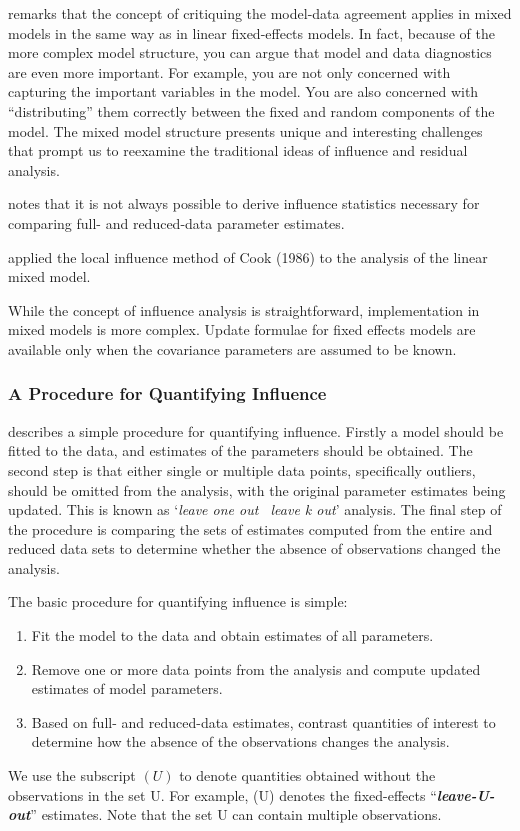 \documentclass[12pt, a4paper]{report}
\theoremstyle{plain}
\theoremstyle{definition}
\theoremstyle{remark}
\begin{document}
	\citet{schabenberger} remarks that the concept of critiquing the model-data agreement applies in mixed models in the same way as in linear
	fixed-effects models. In fact, because of the more complex model structure, you can argue that model and
	data diagnostics are even more important. For example, you are not only concerned with capturing the
	important variables in the model. You are also concerned with ``distributing” them correctly between the
	fixed and random components of the model. The mixed model structure presents unique and interesting
	challenges that prompt us to reexamine the traditional ideas of influence and residual analysis.
	
	
	
	\citet{schabenberger} notes that it is not always possible to derive influence statistics necessary for comparing full- and
	reduced-data parameter estimates. 
	
	\citet{Beckman} applied the local influence method of Cook (1986) to the analysis of the linear mixed model.
	
	While the concept of influence analysis is straightforward, implementation in mixed models is more complex. Update formulae for fixed effects models are available only when the covariance parameters are assumed to be known.
	
	
	
	
	\subsubsection{A Procedure for Quantifying Influence}  %
	\citet{schabenberger} describes a simple procedure for quantifying influence. Firstly a model should be fitted to the data, and
	estimates of the parameters should be obtained. The second step is that either single or multiple data points, specifically outliers,
	should be omitted from the analysis, with the original parameter estimates being updated. This is known as `\textit{leave one out \ leave k out}' analysis. The final step of the procedure is comparing the sets of estimates computed from the entire and reduced data sets to determine whether the absence of observations changed the
	analysis.
	

	The basic procedure for quantifying influence is simple:
	
	\begin{enumerate}
		\item Fit the model to the data and obtain estimates of all parameters.
		\item Remove one or more data points from the analysis and compute updated estimates of model parameters.
		\item Based on full- and reduced-data estimates, contrast quantities of interest to determine how the absence
		of the observations changes the analysis.
	\end{enumerate}
	We use the subscript $(U)$ to denote quantities obtained without the observations in the set U. For example,
	(U) denotes the fixed-effects “\textit{\textbf{leave-U-out}}” estimates. Note that the set U can contain multiple observations.
	
\end{document}
